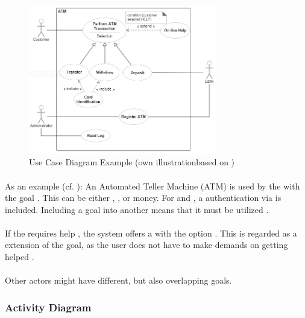 \begin{figure}[H]
    \centering
    \includegraphics[width=0.73\textwidth]{img/ucEx.png}
    \caption[Use Case Diagram Example]{Use Case Diagram Example (own illustrationbased on \cite[641-644]{ObjectManagementGroup.01.03.2015})}\label{fig:ucEx}
\end{figure}

\paragraph{} As an example (cf. ): An Automated Teller Machine (ATM) is used by the  with the goal . This can be either , , or  money. For  and , a authentication via  is included. Including a goal into another means that it must be utilized \parencite[cf.][639]{ObjectManagementGroup.01.03.2015}. 

\paragraph{} If the  requires help , the system offers a  with the option . This is regarded as a extension of the goal, as the user does not have to make demands on getting helped \parencite[cf.][638-639]{ObjectManagementGroup.01.03.2015}.

\paragraph{} 
Other actors might have different, but also overlapping goals.


\subsubsection{Activity Diagram}

